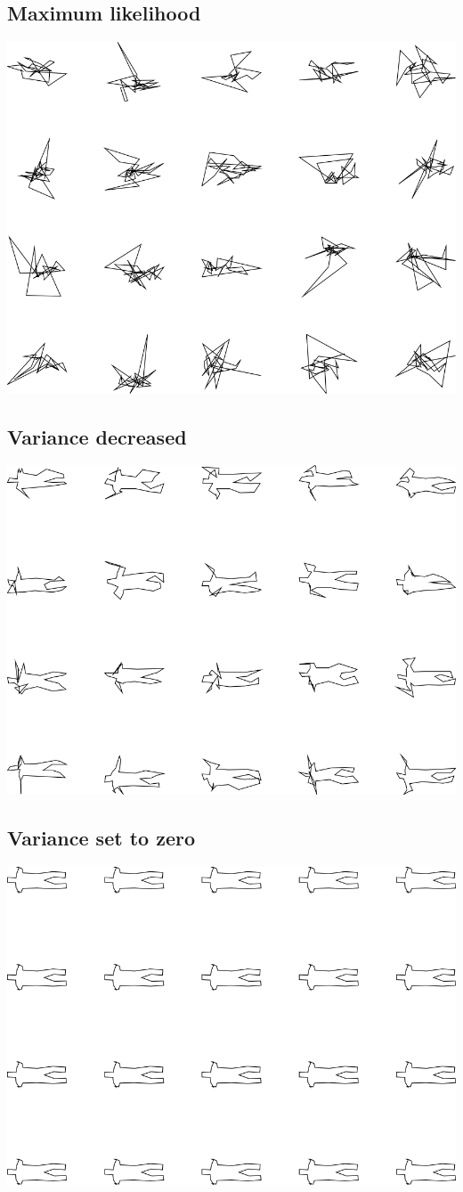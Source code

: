 \subsection{Maximum likelihood}
\includegraphics[width=6in]{output/1.models/comparison_gaussians/comparison_gaussians_gaussians_.png}
\subsection{Variance decreased}
\includegraphics[width=6in]{output/1.models/comparison_gaussians/comparison_gaussians_gaussians_decvar_.png}
\subsection{Variance set to zero}
\includegraphics[width=6in]{output/1.models/comparison_gaussians/comparison_gaussians_gaussians_novar_.png}
